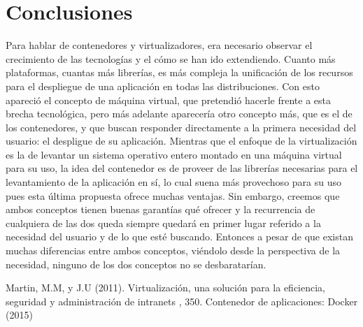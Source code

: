 \documentclass[twoside,twocolumn]{article}
\begin{document}
\section{Conclusiones}

Para hablar de contenedores y virtualizadores, era necesario observar el crecimiento de las tecnologías y el cómo se han ido extendiendo. Cuanto más plataformas, cuantas más librerías, es más compleja la unificación de los recursos para el despliegue de una aplicación en todas las distribuciones. Con esto apareció el concepto de máquina virtual, que pretendió hacerle frente a esta brecha tecnológica, pero más adelante aparecería otro concepto más, que es el de los contenedores, y que buscan responder directamente a la primera necesidad del usuario: el despligue de su aplicación.
Mientras que el enfoque de la virtualización es la de levantar un sistema operativo entero montado en una máquina virtual para su uso, la idea del contenedor es de proveer de las librerías necesarias para el levantamiento de la aplicación en sí, lo cual suena más provechoso para su uso pues esta última propuesta ofrece muchas ventajas. Sin embargo, creemos que ambos conceptos tienen buenas garantías qué ofrecer y la recurrencia de cualquiera de las dos queda siempre quedará en primer lugar referido a la necesidad del usuario y de lo que esté buscando. Entonces a pesar de que existan muchas diferencias entre ambos conceptos, viéndolo desde la perspectiva de la necesidad, ninguno de los dos conceptos no se desbaratarían.

\begin{thebibliography}{99} %

Martin, M.M,  y J.U (2011).
\newblock Virtualización, una solución para la eficiencia,
seguridad y administración de intranets
, 350.
\newblock Contenedor de aplicaciones: Docker (2015)
 
 
\end{thebibliography}

\end{document}

